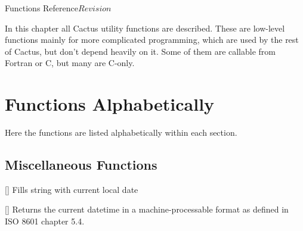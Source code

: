 
\begin{cactuspart}{ Functions Reference}{}{$Revision$}
\label{part:UtilReference}
\renewcommand{\thepage}{\Alph{part}\arabic{page}}


In this chapter all  Cactus utility functions are
described.  These are low-level functions mainly for more complicated
programming, which are used by the rest of Cactus, but don't depend
heavily on it.  Some of them are callable from Fortran or C, but
many are C-only.


\chapter{Functions Alphabetically}

Here the functions are listed alphabetically within each section.


\section{Miscellaneous Functions}

\begin{Lentry}

\item[\code{Util\_CurrentDate}] [\pageref{Util-CurrentDate}]
  Fills string with current local date

\item[\code{Util\_CurrentDateTime}] [\pageref{Util-CurrentDateTime}]
  Returns the current datetime in a machine-processable format
  as defined in ISO 8601 chapter 5.4.


\end{Lentry}
\end{cactuspart}
